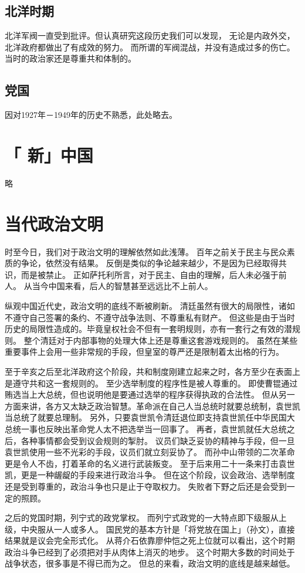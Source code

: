\documentclass[12pt]{article}
\begin{document}
\subsection{北洋时期}
北洋军阀一直受到批评。但认真研究这段历史我们可以发现，
无论是内政外交，北洋政府都做出了有成效的努力。
而所谓的军阀混战，并没有造成过多的伤亡。
当时的政治家还是尊重共和体制的。
\subsection{党国}
因对1927年－1949年的历史不熟悉，此处略去。
\section{「 新」中国}
略
\section{当代政治文明}
时至今日，我们对于政治文明的理解依然如此浅薄。
百年之前关于民主与民众素质的争论，依然没有结果。
反倒是类似的争论越来越少，不是因为已经取得共识，而是被禁止。
正如萨托利所言，对于民主、自由的理解，后人未必强于前人\cite{satuoli:1993uk}。
从当今中国来看，后人的智慧甚至远远比不上前人。

纵观中国近代史，政治文明的底线不断被刷新。
清廷虽然有很大的局限性，诸如不遵守自己签署的条约、不遵守战争法则、不尊重私有财产。
但这些是由于当时历史的局限性造成的。毕竟皇权社会不但有一套明规则，亦有一套行之有效的潜规则。
整个清廷对于内部事物的处理大体上还是尊重这套游戏规则的。
虽然在某些重要事件上会用一些非常规的手段，但皇室的尊严还是限制着太出格的行为。

至于辛亥之后至北洋政府这个阶段，共和制度刚建立起来之时，各方至少在表面上是遵守共和这一套规则的。
至少选举制度的程序性是被人尊重的。
即使曹锟通过贿选当上大总统，但也说明他是要通过选举的程序获得执政的合法性。
但从另一方面来讲，各方又太缺乏政治智慧。革命派在自己人当总统时就要总统制，袁世凯当总统了就要总理制。
另外，只要袁世凯令清廷退位即支持袁世凯任中华民国大总统一事也反映出革命党人太不把选举当一回事了。
再者，袁世凯就任大总统之后，各种事情都会受到议会规则的掣肘。
议员们缺乏妥协的精神与手段，但一旦袁世凯使用一些不光彩的手段，议员们就立刻妥协了。
而孙中山带领的二次革命更是令人不齿，打着革命的名义进行武装叛变。
至于后来用二十一条来打击袁世凯，更是一种龌龊的手段来进行政治斗争。
但在这个阶段，议会政治、选举制度还是受到尊重的，政治斗争也只是止于夺取权力。
失败者下野之后还是会受到一定的照顾。

之后的党国时期，列宁式的政党掌权。
而列宁式政党的一大特点即下级服从上级，中央服从一人或多人。
国民党的基本方针是「将党放在国上」（孙文），直接结果就是议会完全形式化。
从蒋介石依靠廖仲恺之死上位就可以看出，这个时期政治斗争已经到了必须把对手从肉体上消灭的地步。
这个时期大多数的时间处于战争状态，很多事是不得已而为之。
但总的来看，政治文明的底线是越来越低。
\end{document}
